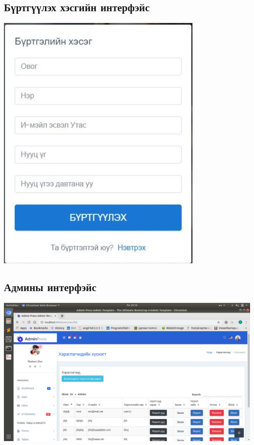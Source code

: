 \documentclass[
oneside, %
english, %
onehalfspacing, %
nolistspacing, %
headsepline, %
]{article} %
\begin{document}
     \subsection{Бүртгүүлэх хэсгийн интерфэйс}
     \includegraphics[width=\textwidth]{delgets}
     \subsection{Админы интерфэйс}
     \includegraphics[width=\textwidth]{delgets1}
\end{document}
